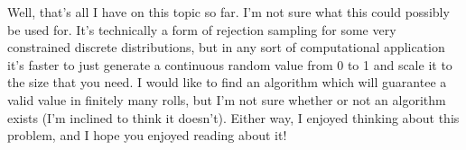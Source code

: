 \documentclass{article}
\begin{document}
\par Well, that's all I have on this topic so far. 
I'm not sure what this could possibly be used for.
It's technically a form of rejection sampling for some very constrained discrete distributions, but in any sort of computational application it's faster to just generate a continuous random value from 0 to 1 and scale it to the size that you need.
I would like to find an algorithm which will guarantee a valid value in finitely many rolls, but I'm not sure whether or not an algorithm exists (I'm inclined to think it doesn't).
Either way, I enjoyed thinking about this problem, and I hope you enjoyed reading about it!
\end{document}
